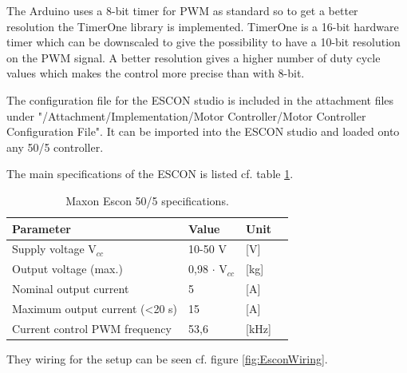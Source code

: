 The Arduino uses a 8-bit timer for PWM as standard so to get a better resolution the TimerOne library is implemented. TimerOne is a 16-bit hardware timer which can be downscaled to give the possibility to have a 10-bit resolution on the PWM signal. A better resolution gives a higher number of duty cycle values which makes the control more precise than with 8-bit. 


The configuration file for the ESCON studio is included in the attachment files under "/Attachment/Implementation/Motor Controller/Motor Controller Configuration File". It can be imported into the ESCON studio and loaded onto any 50/5 controller.

The main specifications of the ESCON is listed cf. table \ref{MaxonSpecifications}.

\begin{table}[htbp]
	\centering
	\begin{tabular}{llll}
	\hline
	Parameter & Value & Unit \\ \hline
	Supply voltage V$_{cc}$& 10-50 V & {[}V{]} \\
	Output voltage (max.) & 0,98 $\cdot$ V$_{cc}$& {[}kg{]} \\
	Nominal output current & 5 & {[}A{]} \\
	Maximum output current (<20 s) & 15 & {[}A{]}\\
	Current control PWM frequency & 53,6 & {[}kHz{]}
	\end{tabular}
\caption{Maxon Escon 50/5 specifications\citep{datasheet:maxon}.}
\label{MaxonSpecifications}
\end{table}

They wiring for the setup can be seen cf. figure \ref{fig:EsconWiring}.  

